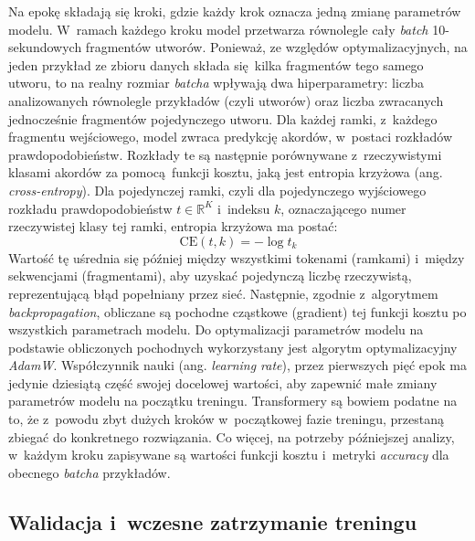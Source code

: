 Na epokę składają się kroki, gdzie każdy krok oznacza jedną zmianę parametrów modelu. W~ramach każdego kroku model przetwarza równolegle cały \emph{batch} 10-sekundowych fragmentów utworów.  Ponieważ, ze względów optymalizacyjnych, na jeden przykład ze zbioru danych składa się kilka fragmentów tego samego utworu, to na realny rozmiar \emph{batcha} wpływają dwa hiperparametry: liczba analizowanych równolegle przykładów (czyli utworów) oraz liczba zwracanych jednocześnie fragmentów pojedynczego utworu. Dla każdej ramki, z~każdego fragmentu wejściowego, model zwraca predykcję akordów, w~postaci rozkładów prawdopodobieństw. Rozkłady te są następnie porównywane z~rzeczywistymi klasami akordów za pomocą funkcji kosztu, jaką jest entropia krzyżowa (ang. \emph{cross-entropy}). Dla pojedynczej ramki, czyli dla pojedynczego wyjściowego rozkładu prawdopodobieństw $t \in \mathbb{R}^K$ i~indeksu $k$, oznaczającego numer rzeczywistej klasy tej ramki, entropia krzyżowa ma postać:
\begin{equation}
    \textrm{CE}(t, k) = - \log t_k
\end{equation}
Wartość tę uśrednia się później między wszystkimi tokenami (ramkami) i~między sekwencjami (fragmentami), aby uzyskać pojedynczą liczbę rzeczywistą, reprezentującą błąd popełniany przez sieć.  Następnie, zgodnie z~algorytmem \emph{backpropagation}, obliczane są pochodne cząstkowe (gradient) tej funkcji kosztu po wszystkich parametrach modelu. Do optymalizacji parametrów modelu na podstawie obliczonych pochodnych wykorzystany jest algorytm optymalizacyjny \emph{AdamW}. Współczynnik nauki (ang. \emph{learning rate}), przez pierwszych pięć epok ma jedynie dziesiątą część swojej docelowej wartości, aby zapewnić małe zmiany parametrów modelu na początku treningu. Transformery są bowiem podatne na to, że z~powodu zbyt dużych kroków w~początkowej fazie treningu, przestaną zbiegać do konkretnego rozwiązania. Co więcej, na potrzeby późniejszej analizy, w~każdym kroku zapisywane są wartości funkcji kosztu i~metryki \emph{accuracy} dla obecnego \emph{batcha} przykładów.

\subsection{Walidacja i~wczesne zatrzymanie treningu}

